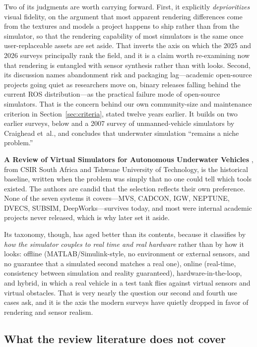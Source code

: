\documentclass[11pt]{article}
\begin{document}
Two of its judgments are worth carrying forward. First, it explicitly \emph{deprioritizes} visual fidelity, on the argument that most apparent rendering differences come from the textures and models a project happens to ship rather than from the simulator, so that the rendering capability of most simulators is the same once user-replaceable assets are set aside. That inverts the axis on which the 2025 and 2026 surveys principally rank the field, and it is a claim worth re-examining now that rendering is entangled with sensor synthesis rather than with looks. Second, its discussion names abandonment risk and packaging lag---academic open-source projects going quiet as researchers move on, binary releases falling behind the current ROS distribution---as the practical failure mode of open-source simulators. That is the concern behind our own community-size and maintenance criterion in Section~\ref{sec:criteria}, stated twelve years earlier. It builds on two earlier surveys, \textcite{matsebe2008review} below and a 2007 survey of unmanned-vehicle simulators by Craighead et~al., and concludes that underwater simulation ``remains a niche problem.''

\textbf{A Review of Virtual Simulators for Autonomous Underwater Vehicles} \autocite{matsebe2008review}, from CSIR South Africa and Tshwane University of Technology, is the historical baseline, written when the problem was simply that no one could tell which tools existed. The authors are candid that the selection reflects their own preference. None of the seven systems it covers---MVS, CADCON, IGW, NEPTUNE, DVECS, SUBSIM, DeepWorks---survives today, and most were internal academic projects never released, which is why \textcite{cook2014auvsim} later set it aside.

Its taxonomy, though, has aged better than its contents, because it classifies by \emph{how the simulator couples to real time and real hardware} rather than by how it looks: offline (MATLAB/Simulink-style, no environment or external sensors, and no guarantee that a simulated second matches a real one), online (real-time, consistency between simulation and reality guaranteed), hardware-in-the-loop, and hybrid, in which a real vehicle in a test tank flies against virtual sensors and virtual obstacles. That is very nearly the question our second and fourth use cases ask, and it is the axis the modern surveys have quietly dropped in favor of rendering and sensor realism.

\subsection*{What the review literature does not cover}
\end{document}
